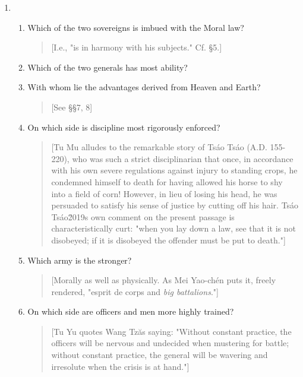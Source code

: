 \documentclass[10pt,a4paper]{book}
\begin{document}
\begin{enumerate}[leftmargin=*, label=\arabic*., resume]

\item \begin{enumerate}[label=(\arabic*), leftmargin=2em]

\item Which of the two sovereigns is imbued with the Moral law?

{\small
\begin{quote}
[I.e., "is in harmony with his subjects." Cf. \S 5.]
\end{quote}
}

\item Which of the two generals has most ability?

\item With whom lie the advantages derived from Heaven and Earth?

{\small
\begin{quote}
[See \S\S 7, 8]
\end{quote}
}

\item On which side is discipline most rigorously enforced?

{\small
\begin{quote}
[Tu Mu alludes to the remarkable story of Ts\'ao Ts\'ao (A.D. 155-220), who was such a strict disciplinarian that once, in accordance with his own severe regulations against injury to standing crops, he condemned himself to death for having allowed his horse to shy into a field of corn! However, in lieu of losing his head, he was persuaded to satisfy his sense of justice by cutting off his hair. Ts\'ao Ts\'ao\u2019s own comment on the present passage is characteristically curt: "when you lay down a law, see that it is not disobeyed; if it is disobeyed the offender must be put to death."]
\end{quote}
}

\item Which army is the stronger?

{\small
\begin{quote}
[Morally as well as physically. As Mei Yao-ch\'en puts it, freely rendered, "esprit de corps and \textit{big battalions}."]
\end{quote}
}

\item On which side are officers and men more highly trained?

{\small
\begin{quote}
[Tu Yu quotes Wang Tz\u as saying: "Without constant practice, the officers will be nervous and undecided when mustering for battle; without constant practice, the general will be wavering and irresolute when the crisis is at hand."]
\end{quote}
}


\end{enumerate}
\end{enumerate}
\end{document}
